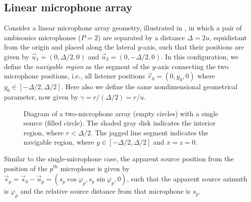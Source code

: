 \subsection{Linear microphone array}\label{sec:06_Simulation_Framework:Linear_Geometry}
Consider a linear microphone array geometry, illustrated in , in which a pair of ambisonics microphones ($P = 2$) are separated by a distance $\Delta = 2u$, equidistant from the origin and placed along the lateral $y$-axis, such that their positions are given by $\vec{u}_1 = (0,\Delta/2,0)$ and $\vec{u}_2 = (0,-\Delta/2,0)$.
In this configuration, we define the \textit{navigable region} as the segment of the $y$-axis connecting the two microphone positions, i.e., all listener positions $\vec{r}_0 = (0, y_0, 0)$ where $y_0 \in [-\Delta/2,\Delta/2]$.
Here also we define the same nondimensional geometrical parameter, now given by $\gamma = r / (\Delta / 2) = r / u$.

\begin{figure}[t]
\centering
  
  \caption[Diagram of the array geometry for interpolation simulations.]{
  Diagram of a two-microphone array (empty circles) with a single source (filled circle).
  The shaded gray disk indicates the interior region, where $r < \Delta / 2$.
  The jagged line segment indicates the navigable region, where $y \in [-\Delta/2,\Delta/2]$ and $x = z = 0$.}
  \label{fig:06_Simulation_Framework:Linear_Geometry}
\end{figure}

Similar to the single-microphone case, the apparent source position from the position of the $p^\textrm{th}$ microphone is given by
$\vec{s}_p = \vec{s}_0 - \vec{u}_p = (s_p \cos \varphi_p, s_p \sin \varphi_p, 0)$,
such that the apparent source azimuth is $\varphi_p$ and the relative source distance from that microphone is $s_p$.